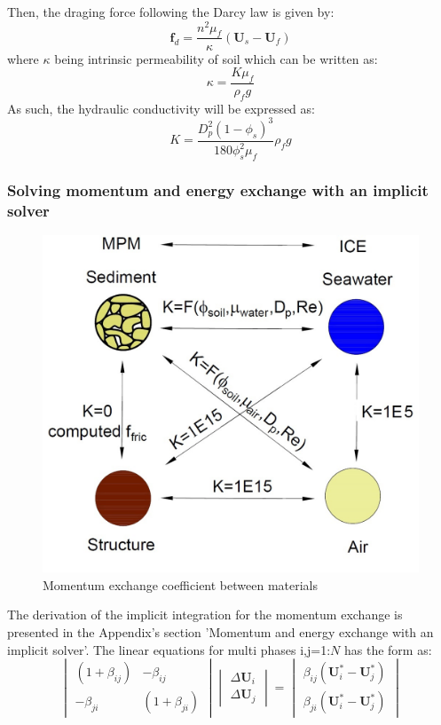 \documentclass[preprint,12pt]{elsarticle}
\begin{document}
%
%
Then, the draging force following the Darcy law is given by:
%
%
\begin{equation}
     \pmb{f}_{d} =  \frac{n^2 \mu_f}{ \kappa}(\pmb{U}_s - \pmb{U}_f)  
\end {equation}
%
%
where $\kappa$ being intrinsic permeability of soil which can be written as:
%
%
\begin{equation}
     \kappa  =  \frac{K \mu_f}{\rho_f  g}
\end {equation}
%
%
As such, the hydraulic conductivity will be expressed as:
%
%
\begin{equation}
    K = \frac{D_p^2 (1-\phi_s)^3}{180 \phi_s^2 \mu_f} \rho_f  g
\end {equation}
%
%

\subsubsection{Solving momentum and energy exchange with an implicit solver}
%
%
\begin{figure}[h]
\center
\includegraphics[scale=1.0]{K.jpg}
\caption{Momentum exchange coefficient between materials}
\label{fig:K}
\end {figure}
%
%
The derivation of the implicit integration for the momentum exchange is presented in the Appendix's section 'Momentum and energy exchange with an implicit solver'. The linear equations for multi phases i,j=1:$N$
has the form as:
%
\[ \begin{vmatrix} (1 + \beta_{ij})  &  -\beta_{ij} \\
                  -\beta_{ji}       &  (1 + \beta_{ji})
    \end {vmatrix}
    \begin{vmatrix} \Delta \pmb{U}_{i} \\
                    \Delta \pmb{U}_{j}
    \end {vmatrix}
    =
    \begin{vmatrix}  \beta_{ij}(\pmb{U}_{i}^{*} - \pmb{U}_{j}^{*}) \\
                    \beta_{ji}(\pmb{U}_{i}^{*} - \pmb{U}_{j}^{*})
    \end {vmatrix}                
\]
\end{document}
